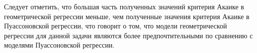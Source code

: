 Следует отметить, что большая часть полученных значений критерия Акаике в геометрической регрессии меньше, чем полученные значения критерия Акаике в Пуассоновской регрессии, что говорит о том, что модели геометрической регрессии для данной задачи являются более предпочтительными по сравнению с моделями Пуассоновской регрессии.




